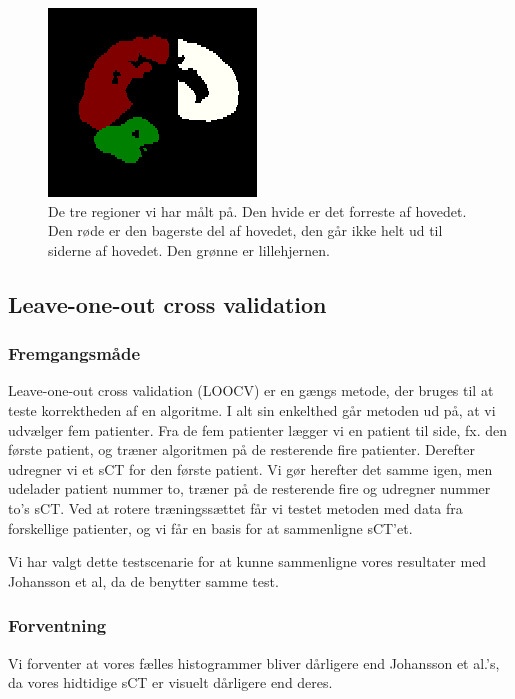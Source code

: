 \begin{figure}
    \centering
   \includegraphics[width=.5\textwidth]{billeder/masks.png}
   \caption{De tre regioner vi har målt på. Den hvide er det forreste af hovedet. Den røde er den bagerste del af hovedet, den går ikke helt ud til siderne af hovedet. Den grønne er lillehjernen.}
   \label{masks}
\end{figure}

\subsection{Leave-one-out cross validation}
\subsubsection{Fremgangsmåde}

Leave-one-out cross validation (LOOCV) er en gængs metode, der bruges til
at teste korrektheden af en algoritme. I alt sin enkelthed går metoden
ud på, at vi udvælger fem patienter. Fra de fem patienter lægger vi en
patient til side, fx. den første patient, og træner algoritmen på de
resterende fire patienter. Derefter udregner vi et sCT for den første
patient. Vi gør herefter det samme igen, men udelader patient nummer to,
træner på de resterende fire og udregner nummer to's sCT.  Ved at
rotere træningssættet får vi testet metoden med data fra forskellige
patienter, og vi får en basis for at sammenligne sCT'et.

Vi har valgt dette testscenarie for at kunne sammenligne vores resultater med Johansson et al, da de benytter samme test.

\subsubsection{Forventning}
Vi forventer at vores fælles histogrammer bliver dårligere end Johansson et al.'s, da vores hidtidige sCT er visuelt dårligere end deres.


